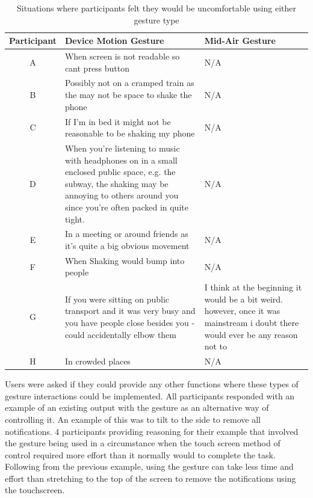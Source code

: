 \documentclass{l4proj}
\begin{document}
\begin{table}[]
    \centering
    \begin{tabular}{ | c | m{5cm} | m{5cm} | }
	    \hline
	    Participant & Device Motion Gesture & Mid-Air Gesture\\
	    \hline
        A & When screen is not readable so cant press button & N/A\\
	    \hline
        B & Possibly not on a cramped train as the may not be space to shake the phone & N/A\\
	    \hline
	    C & If I'm in bed it might not be reasonable to be shaking my phone & N/A\\
	    \hline
	    D & When you're listening to music with headphones on in a small enclosed public space, e.g. the subway, the shaking may be annoying to others around you since you're often packed in quite tight. & N/A\\
	    \hline
	    E & In a meeting or around friends as it's quite a big obvious movement & N/A\\
	    \hline
	    F & When Shaking would bump into people & N/A\\
	    \hline
	    G & If you were sitting on public transport and it was very busy and you have people close besides you - could accidentally elbow them & I think at the beginning it would be a bit weird. however, once it was mainstream i doubt there would ever be any reason not to\\
	    \hline
	    H & In crowded places & N/A\\
	    \hline
    \end{tabular}
    \caption{Situations where participants felt they would be uncomfortable using either gesture type}
    \label{table:Situations}
\end{table}

Users were asked if they could provide any other functions where these types of gesture interactions could be implemented. All participants responded with an example of an existing output with the gesture as an alternative way of controlling it. An example of this was to tilt to the side to remove all notifications. 4 participants providing reasoning for their example that involved the gesture being used in a circumstance when the touch screen method of control required more effort than it normally would to complete the task. Following from the previous example, using the gesture can take less time and effort than stretching to the top of the screen to remove the notifications using the touchscreen.
\end{document}
